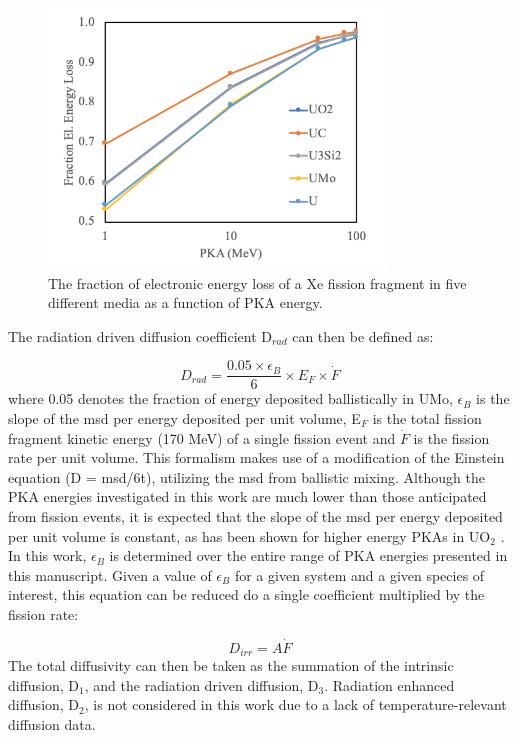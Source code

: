 \documentclass[review]{elsarticle}
\begin{document}
\begin{figure}[h]
 \centering
 \includegraphics[width=0.8\textwidth]{2_el_energy_loss.png} 
 \caption{The fraction of electronic energy loss of a Xe fission fragment in five different media as a function of PKA energy.}
 \label{fig:eloss}
\end{figure} 

The radiation driven diffusion coefficient D$_{rad}$ can then be defined as:

\begin{equation}
\label{eq:1}
D_{rad} = \frac{0.05 \times \epsilon_{B}}{6} \times E_{F} \times \dot F
\end{equation} where 0.05 denotes the fraction of energy deposited ballistically in UMo, $\epsilon_B$ is the slope of the msd per energy deposited per unit volume, E$_F$ is the total fission fragment kinetic energy (170 MeV) of a single fission event and $\dot F$ is the fission rate per unit volume. This formalism makes use of a modification of the Einstein equation (D = msd/6t), utilizing the msd from ballistic mixing. Although the PKA energies investigated in this work are much lower than those anticipated from fission events, it is expected that the slope of the msd per energy deposited per unit volume is constant, as has been shown for higher energy PKAs in UO$_2$ \cite{cooper2016}. In this work, $\epsilon_B$ is determined over the entire range of PKA energies presented in this manuscript. Given a value of $\epsilon_B$ for a given system and a given species of interest, this equation can be reduced do a single coefficient multiplied by the fission rate:

\begin{equation}
\label{eq:2}
D_{irr} = A \dot{F} 
\end{equation} The total diffusivity can then be taken as the summation of the intrinsic diffusion, D$_1$, and the radiation driven diffusion, D$_3$. Radiation enhanced diffusion, D$_2$, is not considered in this work due to a lack of temperature-relevant diffusion data. 
\end{document}
